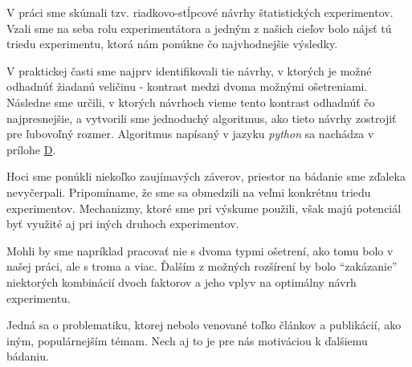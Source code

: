 V práci sme skúmali tzv. riadkovo-stĺpcové návrhy štatistických experimentov. 
Vzali sme na seba rolu experimentátora a jedným z našich cieľov bolo nájsť tú triedu experimentu, ktorá nám ponúkne čo najvhodnejšie výsledky.

V praktickej časti sme najprv identifikovali tie návrhy, v ktorých je možné odhadnúť žiadanú veličinu - kontrast medzi dvoma možnými ošetreniami. 
Následne sme určili, v ktorých návrhoch vieme tento kontrast odhadnúť čo najpresnejšie, a vytvorili sme jednoduchý algoritmus, ako tieto návrhy zostrojiť pre ľubovoľný rozmer. 
Algoritmus napísaný v jazyku \emph{python} sa nachádza v prílohe \hyperref[appendix:d]{D}.

Hoci sme ponúkli niekoľko zaujímavých záverov, priestor na bádanie sme zďaleka nevyčerpali. 
Pripomíname, že sme sa obmedzili na veľmi konkrétnu triedu experimentov. Mechanizmy, ktoré sme pri výskume použili, však majú potenciál byť využité aj pri iných druhoch experimentov.

Mohli by sme napríklad pracovať nie s dvoma typmi ošetrení, ako tomu bolo v našej práci, ale s troma a viac. 
Ďalším z možných rozšírení by bolo “zakázanie” niektorých kombinácií dvoch faktorov a jeho vplyv na optimálny návrh experimentu.

Jedná sa o problematiku, ktorej nebolo venované toľko článkov a publikácií, ako iným, populárnejším témam. 
Nech aj to je pre nás motiváciou k ďalšiemu bádaniu.